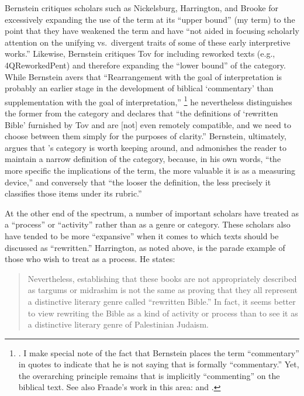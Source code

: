Bernstein critiques scholars such as Nickelsburg,%
    \autocite{nickelsburg_stone1984}
Harrington,%
    \autocite{harrington_kraft-nickelsburg1986}
and Brooke%
    \autocite{brooke_schiffman-vanderkam2000}
for excessively expanding the use of the term \rwb at its ``upper bound'' (my term) to the point that they have weakened the term and have ``not aided in focusing scholarly attention on the unifying vs.~divergent traits of some of these early interpretive works.''%
    \autocite[179]{bernstein_textus2005}
Likewise, Bernstein critiques Tov for including reworked texts (e.g., 4QReworkedPent) and therefore expanding the ``lower bound'' of the category. While Bernstein avers that ``Rearrangement with the goal of interpretation is probably an earlier stage in the development of biblical `commentary' than supplementation with the goal of interpretation,''%
    \footnote{\cite[183]{bernstein_textus2005}. I make special note of the fact that Bernstein places the term ``commentary'' in quotes to indicate that he is not saying that \rwb is formally ``commentary.'' Yet, the overarching principle remains that \rwb is implicitly ``commenting'' on the biblical text. See also Fraade's work in this area: \cite{fraade_bakhos2006} and \cite{fraade_zsengeller2014}.}
he nevertheless distinguishes the former from the category \rwb and declares that ``the definitions of `rewritten Bible' furnished by Tov and \vermes are [not] even remotely compatible, and we need to choose between them simply for the purposes of clarity.''%
    \autocite[185]{bernstein_textus2005}
Bernstein, ultimately, argues that \vermes's category is worth keeping around, and admonishes the reader to maintain a narrow definition of the category, because, in his own words, ``the more specific the implications of the term, the more valuable it is as a measuring device,''%
    \autocite[195]{bernstein_textus2005}
and conversely that ``the looser the definition, the less precisely it classifies those items under its rubric.''%
    \autocite[195]{bernstein_textus2005} 

At the other end of the spectrum, a number of important scholars have treated \rwb as a ``process'' or ``activity'' rather than as a genre or category. These scholars also have tended to be more ``expansive'' when it comes to which texts should be discussed as ``rewritten.'' Harrington, as noted above, is the parade example of those who wish to treat \rwb as a process. He states: 

\begin{quote}
    Nevertheless, establishing that these books are not appropriately described as targums or midrashim is not the same as proving that they all represent a distinctive literary genre called ``rewritten Bible.'' In fact, it seems better to view rewriting the Bible as a kind of activity or process than to see it as a distinctive literary genre of Palestinian Judaism.%
    \autocite[242--243]{harrington_kraft-nickelsburg1986}
\end{quote} 

